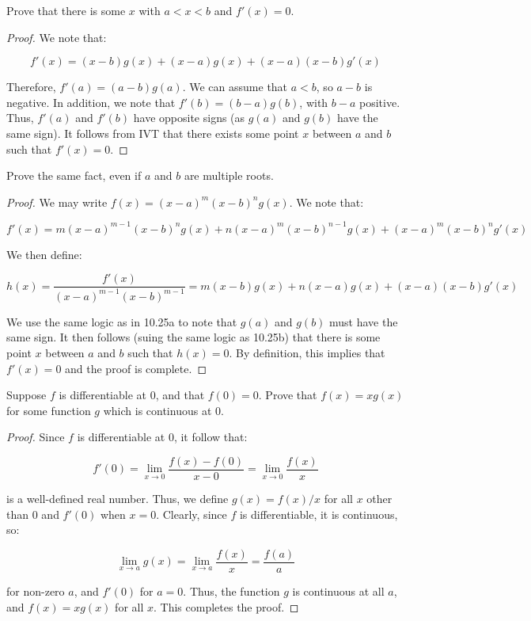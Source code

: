 \documentclass[10pt, oneside]{amsart}
\newenvironment{problem}[2][Problem]{\begin{trivlist}
\item[\hskip \labelsep {\bfseries #1}\hskip \labelsep {\bfseries #2.}]}{\end{trivlist}}
\begin{document}
    \begin{problem}{10.25b}
      Prove that there is some $x$ with $a < x < b$ and $f'(x) = 0$.
    \end{problem}

    \begin{proof}
      We note that:

      $$f'(x) = (x - b) g(x) + (x - a) g(x) + (x - a) (x - b) g'(x)$$

      Therefore, $f'(a) = (a - b)g(a)$. We can assume that $a < b$, so $a - b$ is negative. In addition, we note that $f'(b) = (b - a)g(b)$, with $b - a$
      positive. Thus, $f'(a)$ and $f'(b)$ have opposite signs (as $g(a)$ and $g(b)$ have the same sign). It follows from IVT that there exists some point $x$
      between $a$ and $b$ such that $f'(x) = 0$.
    \end{proof}

    \begin{problem}{10.25c}
      Prove the same fact, even if $a$ and $b$ are multiple roots.
    \end{problem}

    \begin{proof}
      We may write $f(x) = (x - a)^{m} (x - b)^{n} g(x)$. We note that:

      $$f'(x) = m(x - a)^{m - 1} (x - b)^{n} g(x) + n (x - a)^{m} (x - b)^{n - 1} g(x) + (x - a)^{m} (x - b)^{n} g'(x)$$

      We then define:

      $$h(x) = \frac{f'(x)}{(x - a)^{m - 1} (x - b)^{m - 1}} = m (x - b) g(x) + n (x - a) g(x) + (x - a) (x - b) g'(x)$$

      We use the same logic as in 10.25a to note that $g(a)$ and $g(b)$ must have the same sign. It then follows (suing the same logic as 10.25b) that
      there is some point $x$ between $a$ and $b$ such that $h(x) = 0$. By definition, this implies that $f'(x) = 0$ and the proof is complete.
      \end{proof}

    \begin{problem}{10.27}
      Suppose $f$ is differentiable at $0$, and that $f(0) = 0$. Prove that $f(x) = x g(x)$ for some function $g$ which is continuous at $0$.
    \end{problem}

    \begin{proof}
      Since $f$ is differentiable at $0$, it follow that:

      $$f'(0) = \lim_{x \to 0} \frac{f(x) - f(0)}{x - 0} = \lim_{x \to 0} \frac{f(x)}{x}$$

      is a well-defined real number. Thus, we define $g(x) = f(x)/x$ for all $x$ other than $0$ and $f'(0)$ when $x = 0$. Clearly, since
      $f$ is differentiable, it is continuous, so:

      $$\lim_{x \to a} g(x) = \lim_{x \to a} \frac{f(x)}{x} = \frac{f(a)}{a}$$

      for non-zero $a$, and $f'(0)$ for $a = 0$. Thus, the function $g$ is continuous at all $a$, and $f(x) = x g(x)$ for all $x$. This completes the proof.
    \end{proof}
\end{document}
